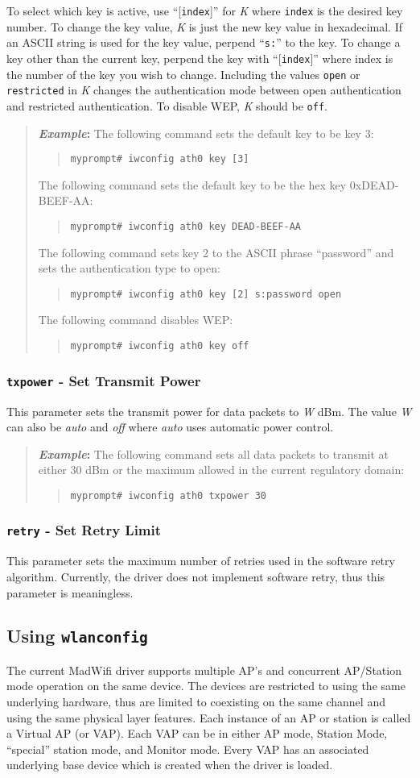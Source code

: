 \documentclass[10pt,fullpage]{article}
\newcommand{\mytt}[1]{{\texttt{#1}}}
\newcommand{\bv}{\begin{verse}}
\newcommand{\ev}{\end{verse}}
\newcommand{\cmd}[1]{{\texttt{myprompt\# #1}}}
\newcommand{\clival}[1]{{\emph{#1}}}
\newenvironment{example}{\begin{quote}\textbf{\textit{Example}:}}{\end{quote}}
\begin{document}
To select which key is active, use ``[\mytt{index}]'' for \clival{K}
where \mytt{index} is the desired key number.  To change the key
value, \clival{K} is just the new key value in hexadecimal.  If an
ASCII string is used for the key value, perpend ``\mytt{s:}'' to the
key.  To change a key other than the current key, perpend the key with
``[\mytt{index}]'' where index is the number of the key you wish to
change.  Including the values \mytt{open} or \mytt{restricted} in
\clival{K} changes the authentication mode between open authentication
and restricted authentication.  To disable WEP, \clival{K} should be \mytt{off}.
\begin{example}
  The following command sets the default key to be key 3:
  \bv
  \cmd{iwconfig ath0 key [3]}
  \ev
  The following command sets the default key to be the hex key
  0xDEAD-BEEF-AA:
  \bv
  \cmd{iwconfig ath0 key DEAD-BEEF-AA}
  \ev
  The following command sets key 2 to the ASCII phrase ``password''
  and sets the authentication type to open:
  \bv
  \cmd{iwconfig ath0 key [2] s:password open}
  \ev
  The following command disables WEP:
  \bv
  \cmd{iwconfig ath0 key off}
  \ev
\end{example}

\subsubsection{\mytt{txpower} - Set Transmit Power}
This parameter sets the transmit power for data packets to \clival{W}
dBm.  The value \clival{W} can also be \clival{auto} and \clival{off}
where \clival{auto} uses automatic power control.
\begin{example}
  The following command sets all data packets to transmit at either 30
  dBm or the maximum allowed in the current regulatory domain:
  \bv
  \cmd{iwconfig ath0 txpower 30}
  \ev
\end{example}

\subsubsection{\mytt{retry} - Set Retry Limit}
This parameter sets the maximum number of retries used in the software
retry algorithm.  Currently, the driver does not implement software
retry, thus this parameter is meaningless.

\subsection{Using \mytt{wlanconfig}}
\label{sec:wlanconfig}
The current MadWifi driver supports multiple AP's and concurrent
AP/Station mode operation on the same device.  The devices are
restricted to using the same underlying hardware, thus are limited to
coexisting on the same channel and using the same physical layer
features.  Each instance of an AP or station is called a Virtual AP
(or VAP). Each VAP can be in either AP mode, Station Mode, ``special''
station mode, and Monitor mode.  Every VAP has an associated
underlying base device which is created when the driver is loaded.
\end{document}

